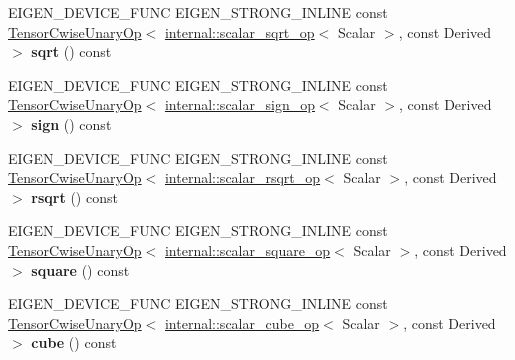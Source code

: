 \begin{DoxyCompactItemize}
E\+I\+G\+E\+N\+\_\+\+D\+E\+V\+I\+C\+E\+\_\+\+F\+U\+NC E\+I\+G\+E\+N\+\_\+\+S\+T\+R\+O\+N\+G\+\_\+\+I\+N\+L\+I\+NE const \hyperlink{class_eigen_1_1_tensor_cwise_unary_op}{Tensor\+Cwise\+Unary\+Op}$<$ \hyperlink{struct_eigen_1_1internal_1_1scalar__sqrt__op}{internal\+::scalar\+\_\+sqrt\+\_\+op}$<$ Scalar $>$, const Derived $>$ {\bfseries sqrt} () const
\item 
\mbox{\label{class_eigen_1_1_tensor_base_3_01_derived_00_01_read_only_accessors_01_4_af2bc2f69fc6bd6cecedf6abb390435a2}} 
E\+I\+G\+E\+N\+\_\+\+D\+E\+V\+I\+C\+E\+\_\+\+F\+U\+NC E\+I\+G\+E\+N\+\_\+\+S\+T\+R\+O\+N\+G\+\_\+\+I\+N\+L\+I\+NE const \hyperlink{class_eigen_1_1_tensor_cwise_unary_op}{Tensor\+Cwise\+Unary\+Op}$<$ \hyperlink{struct_eigen_1_1internal_1_1scalar__sign__op}{internal\+::scalar\+\_\+sign\+\_\+op}$<$ Scalar $>$, const Derived $>$ {\bfseries sign} () const
\item 
\mbox{\label{class_eigen_1_1_tensor_base_3_01_derived_00_01_read_only_accessors_01_4_a7af2b96b287ac5ee3f6ac042f704f9ef}} 
E\+I\+G\+E\+N\+\_\+\+D\+E\+V\+I\+C\+E\+\_\+\+F\+U\+NC E\+I\+G\+E\+N\+\_\+\+S\+T\+R\+O\+N\+G\+\_\+\+I\+N\+L\+I\+NE const \hyperlink{class_eigen_1_1_tensor_cwise_unary_op}{Tensor\+Cwise\+Unary\+Op}$<$ \hyperlink{struct_eigen_1_1internal_1_1scalar__rsqrt__op}{internal\+::scalar\+\_\+rsqrt\+\_\+op}$<$ Scalar $>$, const Derived $>$ {\bfseries rsqrt} () const
\item 
\mbox{\label{class_eigen_1_1_tensor_base_3_01_derived_00_01_read_only_accessors_01_4_a4419063a0b3bc9e950eba9eb15c75ac4}} 
E\+I\+G\+E\+N\+\_\+\+D\+E\+V\+I\+C\+E\+\_\+\+F\+U\+NC E\+I\+G\+E\+N\+\_\+\+S\+T\+R\+O\+N\+G\+\_\+\+I\+N\+L\+I\+NE const \hyperlink{class_eigen_1_1_tensor_cwise_unary_op}{Tensor\+Cwise\+Unary\+Op}$<$ \hyperlink{struct_eigen_1_1internal_1_1scalar__square__op}{internal\+::scalar\+\_\+square\+\_\+op}$<$ Scalar $>$, const Derived $>$ {\bfseries square} () const
\item 
\mbox{\label{class_eigen_1_1_tensor_base_3_01_derived_00_01_read_only_accessors_01_4_a7a4e54f4680569671f682b0a96829a72}} 
E\+I\+G\+E\+N\+\_\+\+D\+E\+V\+I\+C\+E\+\_\+\+F\+U\+NC E\+I\+G\+E\+N\+\_\+\+S\+T\+R\+O\+N\+G\+\_\+\+I\+N\+L\+I\+NE const \hyperlink{class_eigen_1_1_tensor_cwise_unary_op}{Tensor\+Cwise\+Unary\+Op}$<$ \hyperlink{struct_eigen_1_1internal_1_1scalar__cube__op}{internal\+::scalar\+\_\+cube\+\_\+op}$<$ Scalar $>$, const Derived $>$ {\bfseries cube} () const

\end{DoxyCompactItemize}
